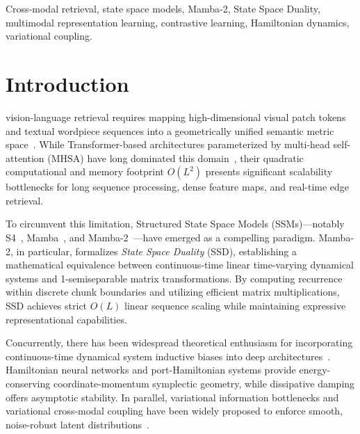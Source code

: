 \documentclass[conference]{IEEEtran}
\begin{document}
\begin{IEEEkeywords}
Cross-modal retrieval, state space models, Mamba-2, State Space Duality, multimodal representation learning, contrastive learning, Hamiltonian dynamics, variational coupling.
\end{IEEEkeywords}

\IEEEpeerreviewmaketitle

\section{Introduction}
\label{sec:introduction}

 vision-language retrieval requires mapping high-dimensional visual patch tokens and textual wordpiece sequences into a geometrically unified semantic metric space~\cite{radford2021learning,wang2016comprehensive}. While Transformer-based architectures parameterized by multi-head self-attention (MHSA) have long dominated this domain~\cite{vaswani2017attention,dosovitskiy2021image,liu2019roberta}, their quadratic computational and memory footprint $O(L^2)$ presents significant scalability bottlenecks for long sequence processing, dense feature maps, and real-time edge retrieval.

To circumvent this limitation, Structured State Space Models (SSMs)---notably S4~\cite{gu2022efficiently}, Mamba~\cite{gu2023mamba}, and Mamba-2~\cite{dao2024transformers}---have emerged as a compelling paradigm. Mamba-2, in particular, formalizes \textit{State Space Duality} (SSD), establishing a mathematical equivalence between continuous-time linear time-varying dynamical systems and 1-semiseparable matrix transformations. By computing recurrence within discrete chunk boundaries and utilizing efficient matrix multiplications, SSD achieves strict $O(L)$ linear sequence scaling while maintaining expressive representational capabilities.

Concurrently, there has been widespread theoretical enthusiasm for incorporating continuous-time dynamical system inductive biases into deep architectures~\cite{greydanus2019hamiltonian,vanderschaft2000}. Hamiltonian neural networks and port-Hamiltonian systems provide energy-conserving coordinate-momentum symplectic geometry, while dissipative damping offers asymptotic stability. In parallel, variational information bottlenecks and variational cross-modal coupling have been widely proposed to enforce smooth, noise-robust latent distributions~\cite{kingma2014auto,alemi2017deep}.
\end{document}
